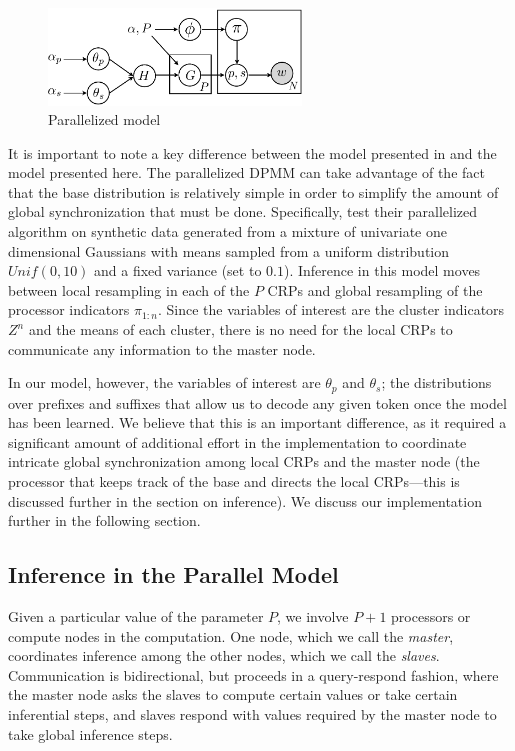 \begin{figure}[h]
  \centering
  \includegraphics[width=0.6\textwidth]{fig/v3}
  \caption{Parallelized model}
  \label{fig:v3}
\end{figure}

It is important to note a key difference between the model presented
in \cite{williamson2013} and the model presented here. The
parallelized DPMM can take advantage of the fact that the base
distribution is relatively simple in order to simplify the amount of
global synchronization that must be done. Specifically,
\cite{williamson2013} test their parallelized algorithm on synthetic
data generated from a mixture of univariate one dimensional Gaussians
with means sampled from a uniform distribution $Unif(0, 10)$ and a
fixed variance (set to $0.1$). Inference in this model moves between
local resampling in each of the $P$ CRPs and global resampling of the
processor indicators $\pi_{1:n}$. Since the variables of interest are
the cluster indicators $Z^n$ and the means of each cluster, there is
no need for the local CRPs to communicate any information to the
master node.

In our model, however, the variables of interest are $\theta_p$ and
$\theta_s$; the distributions over prefixes and suffixes that allow us
to decode any given token once the model has been learned. We believe
that this is an important difference, as it required a significant
amount of additional effort in the implementation to coordinate
intricate global synchronization among local CRPs and the master node
(the processor that keeps track of the base and directs the local
CRPs---this is discussed further in the section on inference). We
discuss our implementation further in the following section.

\subsection{Inference in the Parallel Model}

Given a particular value of the parameter $P$, we involve $P + 1$
processors or compute nodes in the computation. One node, which we call
the \textit{master}, coordinates inference among the other nodes,
which we call the \textit{slaves}. Communication is bidirectional, but
proceeds in a query-respond fashion, where the master node asks the
slaves to compute certain values or take certain inferential steps,
and slaves respond with values required by the master node to take
global inference steps.

